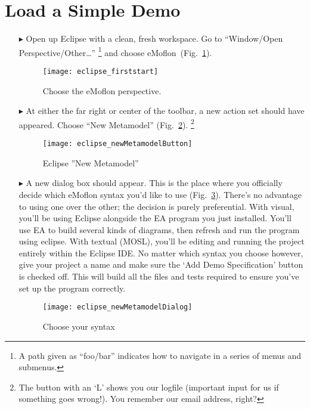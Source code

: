 \newpage
\genHeader
{}

\section{Load a Simple Demo}

\begin{itemize}
\item[$\blacktriangleright$] Open\hypertarget{simpleDemo common}{} up Eclipse with a clean, fresh workspace. Go to ``Window/Open Perspective/Other\ldots'' \footnote{A path given as ``foo/bar'' indicates how to navigate in a series of menus and submenus.} and choose eMoflon~(Fig.~\ref{fig_eclipse}).

\begin{figure}[htbp]
	\centering
  \texttt{[image: eclipse\_firststart]}
	\caption{Choose the eMoflon perspective.}
	\label{fig_eclipse}
\end{figure} 

\item[$\blacktriangleright$] At either the far right or center of the toolbar, a new action set should have appeared. Choose ``New Metamodel'' (Fig.~\ref{fig_eclipseNewMetamodelButton}).
\footnote{The button with an `L' shows you our logfile (important input for us if something goes wrong!). You remember our email address, right?}

\begin{figure}[htbp]
	\centering
  \texttt{[image: eclipse\_newMetamodelButton]}
	\caption{Eclipse ''New Metamodel''}
	\label{fig_eclipseNewMetamodelButton}
\end{figure}

\item[$\blacktriangleright$] A new dialog box should appear. This is the place where you officially decide which eMoflon syntax you'd like to use (Fig.~\ref{fig_chooseSyntax}). There's no advantage to using one over the other; the decision is purely preferential. With visual, you'll be using Eclipse alongside the EA program you just installed. You'll use EA to build several kinds of diagrams, then refresh and run the program using eclipse. With textual (MOSL), you'll be editing and running the project entirely within the Eclipse IDE. No matter which syntax you choose however, give your project a name and make sure the `Add Demo Specification' button is checked off. This will build all the files and tests required to ensure you've set up the program correctly.  

\vspace{1cm}

\begin{figure}[htbp]
	\centering
  \texttt{[image: eclipse\_newMetamodelDialog]}
	\caption{Choose your syntax}
	\label{fig_chooseSyntax}
\end{figure} 
\end{itemize}



